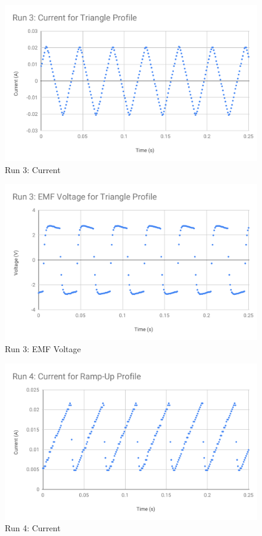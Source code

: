 %
\begin{figure}[ht]
	\centering
	\includegraphics[scale=0.74]{image/04-faraday/run-3-I.pdf}
	\caption{Run 3: Current}
	\label{figure.04.run.3.I}
\end{figure}
%
\begin{figure}[ht]
	\centering
	\includegraphics[scale=0.74]{image/04-faraday/run-3-V.pdf}
	\caption{Run 3: EMF Voltage}
	\label{figure.04.run.3.V}
\end{figure}
%
\begin{figure}[ht]
	\centering
	\includegraphics[scale=0.74]{image/04-faraday/run-4-I.pdf}
	\caption{Run 4: Current}
	\label{figure.04.run.4.I}
\end{figure}
